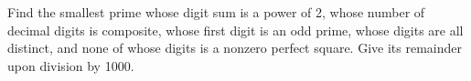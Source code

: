 Find the smallest prime whose digit sum is a power of 2, whose number of decimal digits is composite, whose first digit is an odd prime, whose digits are all distinct, and none of whose digits is a nonzero perfect square. Give its remainder upon division by 1000.
